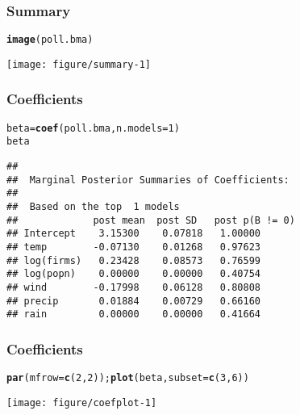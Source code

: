 \documentclass{beamer}\usepackage[]{graphicx}\usepackage[]{color}
\makeatletter
\def\maxwidth{ %
  \ifdim\Gin@nat@width>\linewidth
    \linewidth
  \else
    \Gin@nat@width
  \fi
}
\newcommand{\hlnum}[1]{\textcolor[rgb]{0.686,0.059,0.569}{#1}}%
\newcommand{\hlstd}[1]{\textcolor[rgb]{0.345,0.345,0.345}{#1}}%
\newcommand{\hlkwb}[1]{\textcolor[rgb]{0.69,0.353,0.396}{#1}}%
\newcommand{\hlkwc}[1]{\textcolor[rgb]{0.333,0.667,0.333}{#1}}%
\newcommand{\hlkwd}[1]{\textcolor[rgb]{0.737,0.353,0.396}{\textbf{#1}}}%
\newenvironment{kframe}{%
 \def\at@end@of@kframe{}%
 \ifinner\ifhmode%
  \def\at@end@of@kframe{\end{minipage}}%
  \begin{minipage}{\columnwidth}%
 \fi\fi%
 \def\FrameCommand##1{\hskip\@totalleftmargin \hskip-\fboxsep
 \colorbox{shadecolor}{##1}\hskip-\fboxsep
     \hskip-\linewidth \hskip-\@totalleftmargin \hskip\columnwidth}%
 \MakeFramed {\advance\hsize-\width
   \@totalleftmargin\z@ \linewidth\hsize
   \@setminipage}}%
 {\par\unskip\endMakeFramed%
 \at@end@of@kframe}
\newenvironment{knitrout}{}{} %
\makeatother
\begin{document}
\begin{frame}\frametitle{Summary}
\begin{knitrout}
\color{fgcolor}\begin{kframe}
\begin{alltt}
\hlkwd{image}\hlstd{(poll.bma)}
\end{alltt}
\end{kframe}

{\centering \texttt{[image: figure/summary-1]} 

}



\end{knitrout}
\end{frame}

\begin{frame}[fragile] \frametitle{Coefficients}
\begin{knitrout}
\color{fgcolor}\begin{kframe}
\begin{alltt}
 \hlstd{beta} \hlkwb{=} \hlkwd{coef}\hlstd{(poll.bma,} \hlkwc{n.models}\hlstd{=}\hlnum{1}\hlstd{)}
 \hlstd{beta}
\end{alltt}
\begin{verbatim}
## 
##  Marginal Posterior Summaries of Coefficients: 
## 
##  Based on the top  1 models 
##             post mean  post SD   post p(B != 0)
## Intercept    3.15300    0.07818   1.00000      
## temp        -0.07130    0.01268   0.97623      
## log(firms)   0.23428    0.08573   0.76599      
## log(popn)    0.00000    0.00000   0.40754      
## wind        -0.17998    0.06128   0.80808      
## precip       0.01884    0.00729   0.66160      
## rain         0.00000    0.00000   0.41664
\end{verbatim}
\end{kframe}
\end{knitrout}
\end{frame}

\begin{frame}[fragile] \frametitle{Coefficients}
\begin{knitrout}
\color{fgcolor}\begin{kframe}
\begin{alltt}
 \hlkwd{par}\hlstd{(}\hlkwc{mfrow}\hlstd{=}\hlkwd{c}\hlstd{(}\hlnum{2}\hlstd{,}\hlnum{2}\hlstd{));}  \hlkwd{plot}\hlstd{(beta,} \hlkwc{subset}\hlstd{=}\hlkwd{c}\hlstd{(}\hlnum{3}\hlstd{,} \hlnum{6}\hlstd{))}
\end{alltt}
\end{kframe}
\texttt{[image: figure/coefplot-1]} 

\end{knitrout}

\end{frame}
\end{document}
